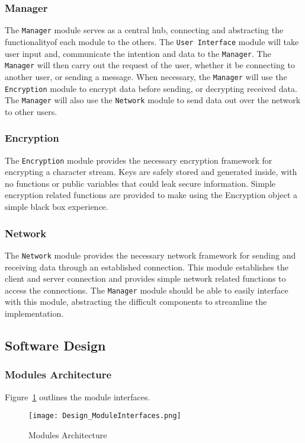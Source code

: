 \documentclass[sigconf]{acmart}
\begin{document}
\subsubsection{Manager}
The \texttt{Manager} module serves as a central hub, connecting and abstracting
the functionalityof each module to the others. The \texttt{User Interface}
module will take user input and, communicate the intention and data to the
\texttt{Manager}. The \texttt{Manager} will then carry out the request of the
user, whether it be connecting to another user, or sending a message. When
necessary, the \texttt{Manager} will use the \texttt{Encryption} module to
encrypt data before sending, or decrypting received data. The \texttt{Manager}
will also use the \texttt{Network} module to send data out over the network to
other users.

\subsubsection{Encryption}
The \texttt{Encryption} module provides the necessary encryption framework for
encrypting a character stream. Keys are safely stored and generated inside,
with no functions or public variables that could leak secure information.
Simple encryption related functions are provided to make using the Encryption
object a simple black box experience.

\subsubsection{Network}
The \texttt{Network} module provides the necessary network framework for
sending and receiving data through an established connection. This module
establishes the client and server connection and provides simple network
related functions to access the connections. The \texttt{Manager} module should
be able to easily interface with this module, abstracting the difficult
components to streamline the implementation.

\subsection{Software Design}

\subsubsection{Modules Architecture}
Figure~\ref{Modules Architecture} outlines the module interfaces.
\begin{figure}[htb]
	\begin{center}
		\texttt{[image: Design\_ModuleInterfaces.png]}
		\caption{Modules Architecture}
		\label{Modules Architecture}
	\end{center}
\end{figure}
\end{document}
